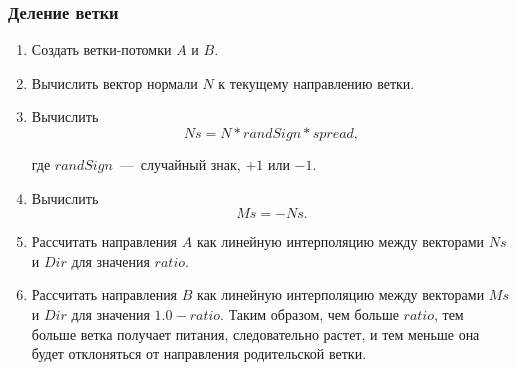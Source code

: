 \subsubsection{Деление ветки}
\begin{enumerate}
	\item Создать ветки-потомки $A$ и $B$.
	\item Вычислить вектор нормали $N$ к текущему направлению ветки.
	\item Вычислить
	\begin{equation}
		Ns = N * randSign * spread,
	\end{equation}	
	
	где $randSign$~---~случайный знак, $+1$ или $-1$.
	
	\item Вычислить
	\begin{equation}
		Ms = -Ns.
	\end{equation}
	
	\item Рассчитать направления $A$ как линейную интерполяцию между векторами $Ns$ и $Dir$ для значения $ratio$.
	\item Рассчитать направления $B$ как линейную интерполяцию между векторами $Ms$ и $Dir$ для значения $1.0 - ratio$. Таким образом, чем больше $ratio$, тем больше ветка получает питания, следовательно растет, и тем меньше она будет отклоняться от направления родительской ветки.
\end{enumerate}

